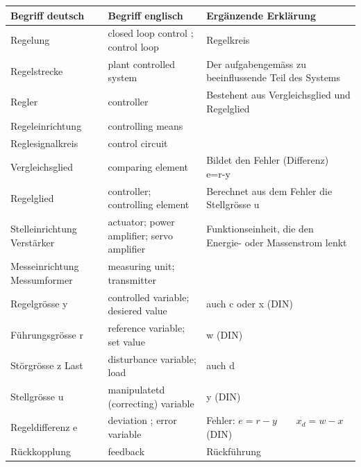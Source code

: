 	\begin{tabular}{|p{2.7cm}|p{5.4cm}|l|}
    	\hline
    	{\bf Begriff deutsch}		&{\bf Begriff englisch}	&{\bf Ergänzende
    	Erklärung} \formelbuch{20}\\
		\hline
		Regelung			& closed loop control ; control loop & Regelkreis\\
		\hline
		Regelstrecke		& plant controlled system	&Der aufgabengemäss zu beeinflussende
    	Teil des Systems\\
    	\hline
    	Regler				& controller			&Bestehent aus Vergleichsglied und Regelglied\\
    	\hline
    	Regeleinrichtung	& controlling means&\\
    	\hline
    	Reglesignalkreis	& control circuit&\\
    	\hline
    	Vergleichsglied		& comparing element	&Bildet den Fehler (Differenz)
    											e=r-y\\
    	\hline
    	Regelglied			&controller;
    						controlling element	&Berechnet aus dem Fehler die Stellgrösse u\\
    	\hline
    	Stelleinrichtung
    	Verstärker			&actuator;
					    	power amplifier;
    						servo amplifier		&Funktionseinheit, die den Energie- oder Massenstrom
    											lenkt\\
    	\hline
    	Messeinrichtung
    	Messumformer		&measuring unit;
    						transmitter&\\
    	\hline
    	Regelgrösse y		&controlled variable;
    						desiered value& auch c oder x (DIN)\\
    	\hline
    	Führungsgrösse r	&reference variable;
    						set value& w (DIN)\\
    	\hline
    	Störgrösse z Last	&disturbance variable;
    						load& auch d\\
    	\hline
    	Stellgrösse u		&manipulatetd (correcting)
    						variable& y (DIN)\\
    	\hline
    	Regeldifferenz e	&deviation ; error variable		& Fehler: $e=r-y \quad \quad x_d=w-x$ (DIN) \\
    	\hline
    	Rückkopplung		&feedback			&Rückführung\\
    	\hline

	\end{tabular}\\

		

